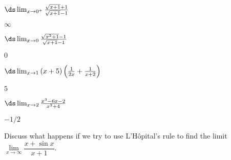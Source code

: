 \begin{enumialphparenastyle}
\begin{ex} 
 $\ds\lim_{x\to0^+}{\sqrt{x+1}+1\over\sqrt{x+1}-1}$
\begin{sol}
 $\infty$
\end{sol}
\end{ex}

\begin{ex} 
 $\ds\lim_{x\to0}{\sqrt{x^2+1}-1\over\sqrt{x+1}-1}$
\begin{sol}
 $0$
\end{sol}
\end{ex}

\begin{ex} 
 $\ds\lim_{x\to1}{(x+5)\left({1\over 2x}+{1\over x+2}\right)}$
\begin{sol}
 $5$
\end{sol}
\end{ex}

\begin{ex} 
 $\ds\lim_{x\to2}{x^3-6x-2\over x^3+4}$
\begin{sol}
 $-1/2$
\end{sol}
\end{ex}

\begin{ex}
Discuss what happens if we try to use L'H\^{o}pital's rule to find the limit $\lim\limits_{x\rightarrow \infty}\dfrac{x+\sin x}{x+1}$.
\end{ex}

\end{enumialphparenastyle}
